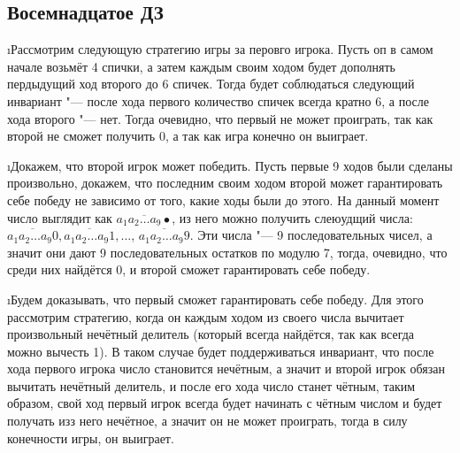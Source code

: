 \subsection{Восемнадцатое ДЗ}


\i Рассмотрим следующую стратегию игры за перовго игрока. Пусть оп в самом начале возьмёт 4 спички, а затем каждым своим ходом будет дополнять пердыдущий ход второго до 6 спичек. Тогда будет соблюдаться следующий инвариант "--- после хода первого количество спичек всегда кратно 6, а после хода второго "--- нет. Тогда очевидно, что первый не может проиграть, так как второй не сможет получить 0, а так как игра конечно он выиграет.

\i Докажем, что второй игрок может победить. Пусть первые 9 ходов были сделаны произвольно, докажем, что последним своим ходом второй может гарантировать себе победу не зависимо от того, какие ходы были до этого. На данный момент число выглядит как $\overline{a_1a_2\ldots a_9\bullet}$, из него можно получить слеюудщий числа: $\overline{a_1a_2\ldots a_9 0}, \overline{a_1a_2\ldots a_9 1}, \ldots$, $\overline{a_1a_2\ldots a_9 9}$. Эти числа "--- 9 последовательных чисел, а значит они дают 9 последовательных остатков по модулю 7, тогда, очевидно, что среди них найдётся 0, и второй сможет гарантировать себе победу.

\i Будем доказывать, что первый сможет гарантировать себе победу. Для этого рассмотрим стратегию, когда он каждым ходом из своего числа вычитает произвольный нечётный делитель (который всегда найдётся,  так как всегда можно вычесть 1). В таком случае будет поддерживаться инвариант, что после хода первого игрока число становится нечётным, а значит и второй игрок обязан вычитать нечётный делитель, и после его хода число станет чётным, таким образом, свой ход первый игрок всегда будет начинать с чётным числом и будет получать изз него нечётное, а значит он не может проиграть, тогда в силу конечности игры, он выиграет.

